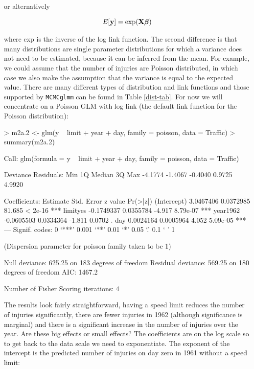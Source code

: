 \documentclass{article}
\begin{document}
or alternatively

\begin{equation}
E[{\bf y}] = \textrm{exp}({\bf X}{\bm \beta})
\end{equation}

where \textrm{exp} is the inverse of the log link function. The second difference is that many distributions are single parameter distributions for which a variance does not need to be estimated, because it can be inferred from the mean. For example, we could assume that the number of injuries are Poisson distributed, in which case we also make the assumption that the variance is equal to the expected value.  There are many different types of distribution and link functions and those supported by \texttt{MCMCglmm} can be found in Table \ref{dist-tab}. For now we will concentrate on a Poisson GLM with log link (the default link function for the Poisson distribution):

\begin{Schunk}
\begin{Sinput}
> m2a.2 <- glm(y ~ limit + year + day, family = poisson, data = Traffic)
> summary(m2a.2)
\end{Sinput}
\begin{Soutput}
Call:
glm(formula = y ~ limit + year + day, family = poisson, data = Traffic)

Deviance Residuals: 
    Min       1Q   Median       3Q      Max  
-4.1774  -1.4067  -0.4040   0.9725   4.9920  

Coefficients:
              Estimate Std. Error z value Pr(>|z|)    
(Intercept)  3.0467406  0.0372985  81.685  < 2e-16 ***
limityes    -0.1749337  0.0355784  -4.917 8.79e-07 ***
year1962    -0.0605503  0.0334364  -1.811   0.0702 .  
day          0.0024164  0.0005964   4.052 5.09e-05 ***
---
Signif. codes:  0 ‘***’ 0.001 ‘**’ 0.01 ‘*’ 0.05 ‘.’ 0.1 ‘ ’ 1 

(Dispersion parameter for poisson family taken to be 1)

    Null deviance: 625.25  on 183  degrees of freedom
Residual deviance: 569.25  on 180  degrees of freedom
AIC: 1467.2

Number of Fisher Scoring iterations: 4
\end{Soutput}
\end{Schunk}

The results look fairly straightforward, having a speed limit reduces the number of injuries significantly, there are fewer injuries in 1962 (although significance is marginal) and there is a significant increase in the number of injuries over the year. Are these big effects or small effects? The coefficients are on the log scale so to get back to the data scale we need to exponentiate. The exponent of the intercept is the predicted number of injuries on day zero in 1961 without a speed limit:
\end{document}
